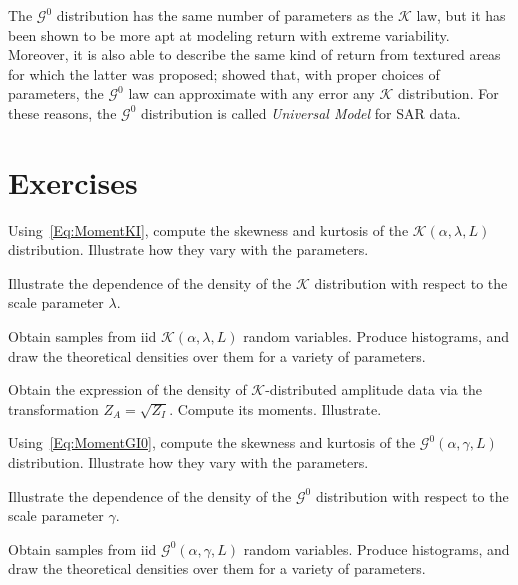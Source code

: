 The $\mathcal{G}^0$ distribution has the same number of parameters as the $\mathcal{K}$ law, but it has been shown to be more apt at modeling return with extreme variability.
Moreover, it is also able to describe the same kind of return from textured areas for which the latter was proposed; \citet{MejailJacoboFreryBustos:IJRS} showed that, with proper choices of parameters, the $\mathcal G^0$ law can approximate with any error any $\mathcal K$ distribution.
For these reasons, the $\mathcal G^0$ distribution is called \textit{Universal Model} for SAR data.


\section*{Exercises}

\begin{exer}
Using~\eqref{Eq:MomentKI}, compute the skewness and kurtosis of the $\mathcal K(\alpha,\lambda,L)$ distribution.
Illustrate how they vary with the parameters.
\end{exer}

\begin{exer}
Illustrate the dependence of the density of the $\mathcal K$ distribution with respect to the scale parameter $\lambda$.
\end{exer}

\begin{exer}
Obtain samples from iid $\mathcal{K}(\alpha,\lambda,L)$ random variables.
Produce histograms, and draw the theoretical densities over them for a variety of parameters.
\end{exer}

\begin{exer}
Obtain the expression of the density of $\mathcal K$-distributed amplitude data via the transformation $Z_A=\sqrt{Z_I}$.
Compute its moments.
Illustrate.
\end{exer}

\begin{exer}
Using~\eqref{Eq:MomentGI0}, compute the skewness and kurtosis of the $\mathcal G^0(\alpha,\gamma,L)$ distribution.
Illustrate how they vary with the parameters.
\end{exer}

\begin{exer}
Illustrate the dependence of the density of the $\mathcal G^0$ distribution with respect to the scale parameter $\gamma$.
\end{exer}

\begin{exer}
Obtain samples from iid $\mathcal{G}^0(\alpha,\gamma,L)$ random variables.
Produce histograms, and draw the theoretical densities over them for a variety of parameters.
\end{exer}

